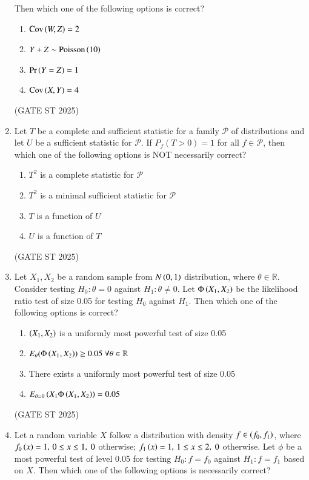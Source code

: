 \documentclass[journal,12pt,onecolumn]{IEEEtran}
\theoremstyle{remark}
\begin{document}
\begin{enumerate}
Then which one of the following options is correct?
\begin{enumerate}
\item $\operatorname{Cov}\left(W,Z\right) = 2$
\item $Y + Z \sim \operatorname{Poisson}\left(10\right)$
\item $\Pr\left(Y = Z\right) = 1$
\item $\operatorname{Cov}\left(X,Y\right) = 4$
\end{enumerate}
\hfill{(GATE ST 2025)}
\item Let $T$ be a complete and sufficient statistic for a family $\mathcal{P}$ of distributions and let $U$ be a sufficient statistic for $\mathcal{P}$. If $P_f(T>0) = 1$ for all $f\in\mathcal{P}$, then which one of the following options is NOT necessarily correct?
\begin{enumerate}
\item $T^2$ is a complete statistic for $\mathcal{P}$
\item $T^2$ is a minimal sufficient statistic for $\mathcal{P}$
\item $T$ is a function of $U$
\item $U$ is a function of $T$
\end{enumerate}
\hfill{(GATE ST 2025)}
\item Let $X_1, X_2$ be a random sample from $N\left(0,1\right)$ distribution, where $\theta\in\mathbb{R}$. Consider testing $H_0: \theta=0$ against $H_1:\theta \neq 0$. Let $\Phi\left(X_1, X_2\right)$ be the likelihood ratio test of size 0.05 for testing $H_0$ against $H_1$. Then which one of the following options is correct?
\begin{enumerate}
\item $\left(X_1, X_2\right)$ is a uniformly most powerful test of size 0.05
\item $E_\theta(\Phi\left(X_1,X_2\right)) \geq 0.05~\forall\theta \in \mathbb{R}$
\item There exists a uniformly most powerful test of size 0.05
\item $E_{\theta=0}\left(X_1\Phi\left(X_1,X_2\right)\right) = 0.05$
\end{enumerate}
\hfill{(GATE ST 2025)}
\item Let a random variable $X$ follow a distribution with density $f\in\left(f_0, f_1\right)$, where
$f_0\left(x\right)=1, \, 0\leq x\leq 1,~0$ otherwise;
$f_1\left(x\right)=1, \, 1\leq x\leq 2,~0$ otherwise.
Let $\phi$ be a most powerful test of level 0.05 for testing $H_0: f=f_0$ against $H_1: f=f_1$ based on $X$. Then which one of the following options is necessarily correct?

\end{enumerate}
\end{document}
